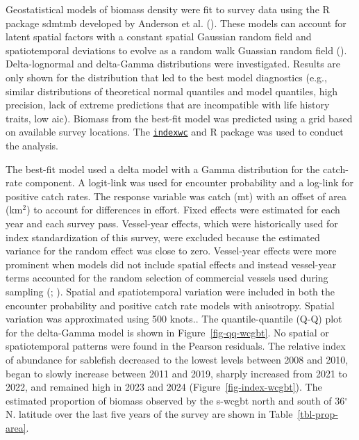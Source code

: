 \documentclass[
  english,
]{article}
\begin{document}
Geostatistical models of biomass density were fit to survey data using
the R package \gls{sdmtmb} developed by Anderson et al.
(). These models can account for
latent spatial factors with a constant spatial Gaussian random field and
spatiotemporal deviations to evolve as a random walk Guassian random
field ().
Delta-lognormal and delta-Gamma distributions were investigated. Results
are only shown for the distribution that led to the best model
diagnostics (e.g., similar distributions of theoretical normal quantiles
and model quantiles, high precision, lack of extreme predictions that
are incompatible with life history traits, low \gls{aic}). Biomass from
the best-fit model was predicted using a grid based on available survey
locations. The
\href{https://pfmc-assessments.github.io/indexwc/}{\texttt{indexwc}} and
R package was used to conduct the analysis.

The best-fit model used a delta model with a Gamma distribution for the
catch-rate component. A logit-link was used for encounter probability
and a log-link for positive catch rates. The response variable was catch
(mt) with an offset of area (km\(^2\)) to account for differences in
effort. Fixed effects were estimated for each year and each survey pass.
Vessel-year effects, which were historically used for index
standardization of this survey, were excluded because the estimated
variance for the random effect was close to zero. Vessel-year effects
were more prominent when models did not include spatial effects and
instead vessel-year terms accounted for the random selection of
commercial vessels used during sampling
(;
). Spatial
and spatiotemporal variation were included in both the encounter
probability and positive catch rate models with anisotropy. Spatial
variation was approximated using 500 knots.. The quantile-quantile (Q-Q)
plot for the delta-Gamma model is shown in Figure~\ref{fig-qq-wcgbt}. No
spatial or spatiotemporal patterns were found in the Pearson residuals.
The relative index of abundance for sablefish decreased to the lowest
levels between 2008 and 2010, began to slowly increase between 2011 and
2019, sharply increased from 2021 to 2022, and remained high in 2023 and
2024 (Figure~\ref{fig-index-wcgbt}). The estimated proportion of biomass
observed by the \gls{s-wcgbt} north and south of 36\(^\circ\) N.
latitude over the last five years of the survey are shown in
Table~\ref{tbl-prop-area}.
\end{document}
